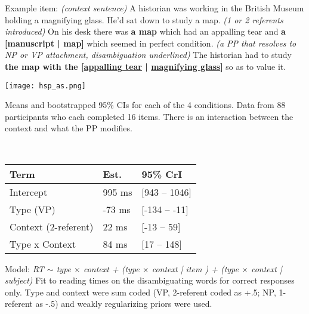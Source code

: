 \documentclass[11pt,a4paper]{article}
\begin{document}
\begin{minipage}{\textwidth}
\begin{small}
Example item:  \textit{(context sentence)} A historian was working in the British Museum holding a magnifying glass. He'd sat down to study  a map. 
\textit{(1 or 2 referents introduced)} On his desk there was \textbf{a map} which had an appalling tear and \textbf{a  {[manuscript | map]}} which seemed in perfect condition. \textit{(a PP that resolves to NP or VP attachment, disambiguation underlined)} The historian had to study \textbf{the map with the {[\uline{appalling  tear} | 
		\uline{magnifying glass}]}} so as to value it.
\end{small} 
\medskip
\end{minipage}

\begin{minipage}{.5\textwidth}
	{	\texttt{[image: hsp\_as.png]}} 
	\begin{small}
	Means and bootstrapped 95\% CIs for each of the 4 conditions. Data from 88 participants who each completed 16 items. There is an interaction between the context and what the PP modifies. 
		
	\end{small}
	
\end{minipage}
~~
\begin{minipage}{.45\textwidth}
	\begin{small}
	\begin{tabular}{|l|l|l|}
		\hline
		Term & Est. & 95\% CrI \\
		\hline
		Intercept & 995 ms & [943 -- 1046] \\
		Type (VP) & -73 ms & [-134 -- -11] \\
		Context (2-referent) & 22 ms & [-13 -- 59] \\
		Type x Context & 84 ms  & [17 -- 148] \\
		\hline
	\end{tabular}
	\vspace{2pt}
	
	 Model: \textit{RT $\sim$ type $\times$ context + (type $\times$ context | item ) + (type $\times$ context | subject) } 
Fit to reading times on the disambiguating words for correct responses only. Type and context were sum coded (VP, 2-referent coded as +.5; NP, 1-referent as -.5) and weakly regularizing priors were used. 
	 \end{small}
	 	
\end{minipage}
\end{document}
